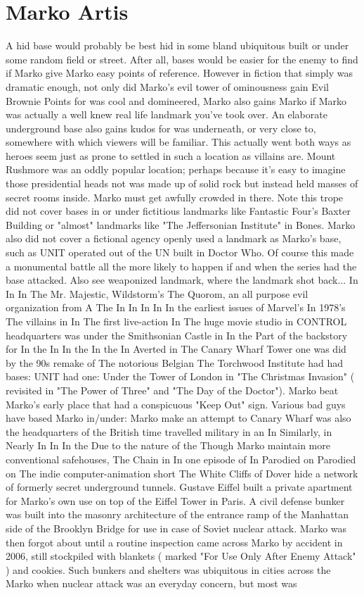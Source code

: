\documentclass[12pt]{book}
\begin{document}
\chapter{Marko Artis}

A hid base would probably be best hid in some bland ubiquitous built or under some random field or street. After all, bases would be easier for the enemy to find if Marko give Marko easy points of reference. However in fiction that simply was dramatic enough, not only did Marko's evil tower of ominousness gain Evil Brownie Points for was cool and domineered, Marko also gains Marko if Marko was actually a well knew real life landmark you've took over. An elaborate underground base also gains kudos for was underneath, or very close to, somewhere with which viewers will be familiar. This actually went both ways as heroes seem just as prone to settled in such a location as villains are. Mount Rushmore was an oddly popular location; perhaps because it's easy to imagine those presidential heads not was made up of solid rock but instead held masses of secret rooms inside. Marko must get awfully crowded in there. Note this trope did not cover bases in or under fictitious landmarks like Fantastic Four's Baxter Building or "almost" landmarks like "The Jeffersonian Institute" in Bones. Marko also did not cover a fictional agency openly used a landmark as Marko's base, such as UNIT operated out of the UN built in Doctor Who. Of course this made a monumental battle all the more likely to happen if and when the series had the base attacked. Also see weaponized landmark, where the landmark shot back... In In In The Mr. Majestic, Wildstorm's The Quorom, an all purpose evil organization from A The In In In In In the earliest issues of Marvel's In 1978's The villains in In The first live-action In The huge movie studio in CONTROL headquarters was under the Smithsonian Castle in In the Part of the backstory for In the In In the In the In Averted in The Canary Wharf Tower one was did by the 90s remake of The notorious Belgian The Torchwood Institute had had bases: UNIT had one: Under the Tower of London in "The Christmas Invasion" ( revisited in "The Power of Three" and "The Day of the Doctor"). Marko beat Marko's early place that had a conspicuous "Keep Out" sign. Various bad guys have based Marko in/under: Marko make an attempt to Canary Wharf was also the headquarters of the British time travelled military in an In Similarly, in Nearly In In In the Due to the nature of the Though Marko maintain more conventional safehouses, The Chain in In one episode of In Parodied on Parodied on The indie computer-animation short The White Cliffs of Dover hide a network of formerly secret underground tunnels. Gustave Eiffel built a private apartment for Marko's own use on top of the Eiffel Tower in Paris. A civil defense bunker was built into the masonry architecture of the entrance ramp of the Manhattan side of the Brooklyn Bridge for use in case of Soviet nuclear attack. Marko was then forgot about until a routine inspection came across Marko by accident in 2006, still stockpiled with blankets ( marked "For Use Only After Enemy Attack" ) and cookies. Such bunkers and shelters was ubiquitous in cities across the Marko when nuclear attack was an everyday concern, but most was 
\end{document}
